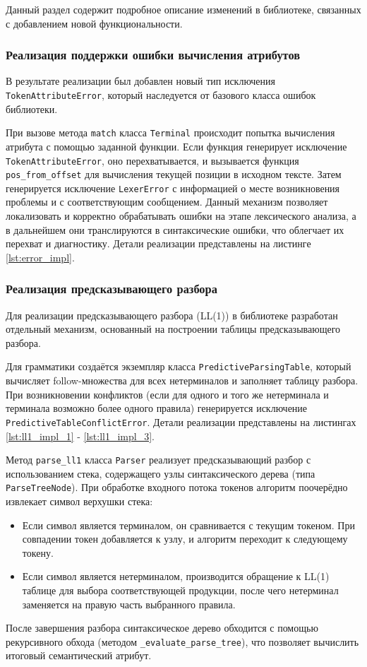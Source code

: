 \documentclass[14pt, russian]{scrartcl}
\begin{document}
Данный раздел содержит подробное описание изменений в библиотеке, связанных с добавлением новой функциональности.

\subsubsection{Реализация поддержки ошибки вычисления атрибутов}

В результате реализации был добавлен новый тип исключения \texttt{TokenAttributeError}, который наследуется от
базового класса ошибок библиотеки.

При вызове метода \texttt{match} класса \texttt{Terminal} происходит попытка вычисления атрибута с помощью
заданной функции. Если функция генерирует исключение \texttt{TokenAttributeError}, оно перехватывается,
и вызывается функция \texttt{pos\_from\_offset} для вычисления текущей позиции в исходном тексте.
Затем генерируется исключение \texttt{LexerError} с информацией о месте возникновения проблемы и с
соответствующим сообщением. Данный механизм позволяет локализовать и корректно обрабатывать ошибки на этапе
лексического анализа, а в дальнейшем они транслируются в синтаксические ошибки, что облегчает их перехват
и диагностику. Детали реализации представлены на листинге \ref{lst:error_impl}.

\subsubsection{Реализация предсказывающего разбора}

Для реализации предсказывающего разбора (LL(1)) в библиотеке разработан отдельный механизм, основанный на
построении таблицы предсказывающего разбора.

Для грамматики создаётся экземпляр класса \texttt{PredictiveParsingTable}, который вычисляет follow-множества
для всех нетерминалов и заполняет таблицу разбора. При возникновении конфликтов (если для одного и того же
нетерминала и терминала возможно более одного правила) генерируется исключение
\texttt{PredictiveTableConflictError}. Детали реализации представлены на листингах \ref{lst:ll1_impl_1}
- \ref{lst:ll1_impl_3}.

Метод \texttt{parse\_ll1} класса \texttt{Parser} реализует предсказывающий разбор с использованием стека,
содержащего узлы синтаксического дерева (типа \texttt{ParseTreeNode}). При обработке входного потока токенов
алгоритм поочерёдно извлекает символ верхушки стека:
\begin{itemize}
	\item Если символ является терминалом, он сравнивается с текущим токеном. При совпадении токен добавляется
	к узлу, и алгоритм переходит к следующему токену.
	\item Если символ является нетерминалом, производится обращение к LL(1) таблице для выбора соответствующей
	продукции, после чего нетерминал заменяется на правую часть выбранного правила.
\end{itemize}
После завершения разбора синтаксическое дерево обходится с помощью рекурсивного обхода
(методом \texttt{\_evaluate\_parse\_tree}), что позволяет вычислить итоговый семантический атрибут.
\end{document}

